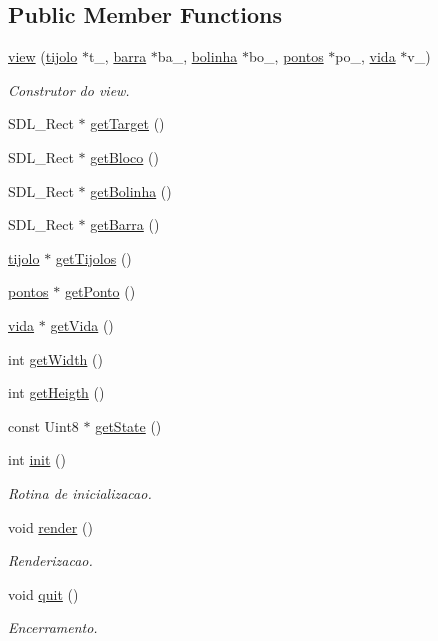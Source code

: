 \subsection*{Public Member Functions}
\begin{DoxyCompactItemize}
\item 
\hyperlink{classview_a95b782bfe0890878f5740f63d7cd89ba}{view} (\hyperlink{classtijolo}{tijolo} $\ast$t\+\_\+, \hyperlink{classbarra}{barra} $\ast$ba\+\_\+, \hyperlink{classbolinha}{bolinha} $\ast$bo\+\_\+, \hyperlink{classpontos}{pontos} $\ast$po\+\_\+, \hyperlink{classvida}{vida} $\ast$v\+\_\+)
\begin{DoxyCompactList}\small\item\em Construtor do view. \end{DoxyCompactList}\item 
S\+D\+L\+\_\+\+Rect $\ast$ \hyperlink{classview_a4bf37f4171f4bb15c0e5b4ab8c2a9faa}{get\+Target} ()
\item 
S\+D\+L\+\_\+\+Rect $\ast$ \hyperlink{classview_a8b12f1f06de39d6e9f70f54a9281e05c}{get\+Bloco} ()
\item 
S\+D\+L\+\_\+\+Rect $\ast$ \hyperlink{classview_a8eb9d89d9b55a5d2ee529c96e0dc246a}{get\+Bolinha} ()
\item 
S\+D\+L\+\_\+\+Rect $\ast$ \hyperlink{classview_a57b60e5da21e0484081d71c69ba4d03e}{get\+Barra} ()
\item 
\hyperlink{classtijolo}{tijolo} $\ast$ \hyperlink{classview_ab159a52c699a49119e7dfd78384af275}{get\+Tijolos} ()
\item 
\hyperlink{classpontos}{pontos} $\ast$ \hyperlink{classview_a6cd53aa4df2642579992803a18f0bc8b}{get\+Ponto} ()
\item 
\hyperlink{classvida}{vida} $\ast$ \hyperlink{classview_aa33f3e6bf59ada95ee9fd0bff5af22c0}{get\+Vida} ()
\item 
int \hyperlink{classview_aba1c490d357bb58f4aa9218cb96b42b0}{get\+Width} ()
\item 
int \hyperlink{classview_af2cf0c4a4d7cd84f0155ae1ad6a51d0a}{get\+Heigth} ()
\item 
const Uint8 $\ast$ \hyperlink{classview_a5dd0f6c8f5d5f9123353986607c7fb77}{get\+State} ()
\item 
int \hyperlink{classview_a21d953772b41dd9c08c9ea9895e002d7}{init} ()
\begin{DoxyCompactList}\small\item\em Rotina de inicializacao. \end{DoxyCompactList}\item 
void \hyperlink{classview_a91e9b24e39a9846a7093949c9a19a118}{render} ()
\begin{DoxyCompactList}\small\item\em Renderizacao. \end{DoxyCompactList}\item 
void \hyperlink{classview_ad8c046a243e52ee4f902abec6fbec9bb}{quit} ()
\begin{DoxyCompactList}\small\item\em Encerramento. \end{DoxyCompactList}\end{DoxyCompactItemize}

